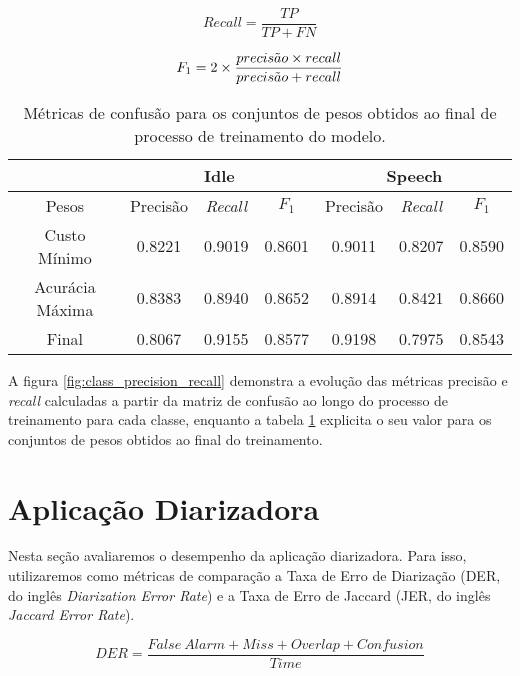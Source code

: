 \begin{equation}\label{eq:recall}
    Recall = \frac{TP}{TP + FN}
\end{equation}

\begin{equation}\label{eq:f1-score}
    F_1 = 2 \times \frac{precis\Tilde{a}o \times recall}{precis\Tilde{a}o + recall}
\end{equation}

\begin{table}[ht]
    \centering
    \begin{tabular}{|c|c|c|c|c|c|c|}
        \hline
         & \multicolumn{3}{c|}{Idle} & \multicolumn{3}{c|}{Speech}  \\
        \hline
        Pesos & Precisão & \textit{Recall} & $F_1$ & Precisão & \textit{Recall} & $F_1$ \\
        \hline
        \hline
        Custo Mínimo & 0.8221 & 0.9019 & 0.8601 & 0.9011 & 0.8207 & 0.8590 \\
        \hline
        Acurácia Máxima & 0.8383 & 0.8940 & 0.8652 & 0.8914 & 0.8421 & 0.8660 \\
        \hline
        Final & 0.8067 & 0.9155 & 0.8577 & 0.9198 & 0.7975 & 0.8543 \\
        \hline
    \end{tabular}
    \caption{Métricas de confusão para os conjuntos de pesos obtidos ao final de processo de treinamento do modelo.}
    \label{tab:confusion_metrics_val}
\end{table}

A figura \ref{fig:class_precision_recall} demonstra a evolução das métricas precisão e \textit{recall} calculadas a partir da matriz de confusão ao longo do processo de treinamento para cada classe, enquanto a tabela \ref{tab:confusion_metrics_val} explicita o seu valor para os conjuntos de pesos obtidos ao final do treinamento.

\section{Aplicação Diarizadora}
\label{sec:results-app}

Nesta seção avaliaremos o desempenho da aplicação diarizadora.
Para isso, utilizaremos como métricas de comparação a Taxa de Erro de Diarização (DER, do inglês \textit{Diarization Error Rate}) e a Taxa de Erro de Jaccard (JER, do inglês \textit{Jaccard Error Rate}).

\begin{equation}\label{eq:der}
    DER = \frac{False\ Alarm + Miss + Overlap + Confusion}{Time} 
\end{equation}

